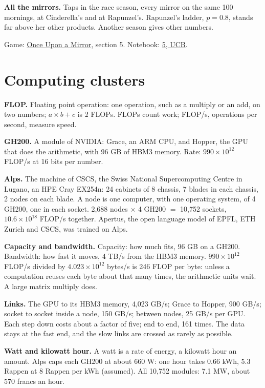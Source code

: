 \documentclass[11pt,a4paper]{article}
\newcommand{\term}[1]{\textbf{#1}}
\newcommand{\beside}[2]{\par\noindent\sbox{\besidebox}{#1}\usebox{\besidebox}\hfill
  \begin{minipage}[c]{\dimexpr\textwidth-\wd\besidebox-1.5em\relax}\raggedright#2\end{minipage}\par}
\newcommand{\Mirror}{\href{https://eth-ainit-hs26.github.io/AINIT-PAGE/viz/we2/mirror/}{Once Upon a Mirror}}
\newcommand{\NbFive}{\href{https://colab.research.google.com/github/eth-ainit-hs26/w2-cx-public/blob/main/03_cx_bandits_5_ucb_student.ipynb}{5, UCB}}
\begin{document}
\beside{}{\term{All the mirrors.} Taps in the race season, every mirror on the
same 100 mornings, at Cinderella's and at Rapunzel's. Rapunzel's ladder, $p = 0.8$, stands far above her other
products. Another season gives other numbers.}

Game: \Mirror, section 5. Notebook: \NbFive.

\section{Computing clusters}

\term{FLOP.} Floating point operation: one operation, such as a multiply or an add, on two numbers; $a \times b + c$
is 2 FLOPs. FLOPs count work; FLOP/s, operations per second, measure speed.

\term{GH200.} A module of NVIDIA: Grace, an ARM CPU, and Hopper, the GPU that does the arithmetic, with 96 GB of
HBM3 memory. Rate: $990 \times 10^{12}$ FLOP/s at 16 bits per number.

\term{Alps.} The machine of CSCS, the Swiss National Supercomputing Centre in Lugano, an HPE Cray EX254n: 24 cabinets
of 8 chassis, 7 blades in each chassis, 2 nodes on each blade. A node is one computer, with one operating system, of
4 GH200, one in each socket. 2,688 nodes $\times$ 4 GH200 $=$ 10,752 sockets, $10.6 \times 10^{18}$ FLOP/s together.
Apertus, the open language model of EPFL, ETH Zurich and CSCS, was trained on Alps.

\term{Capacity and bandwidth.} Capacity: how much fits, 96 GB on a GH200. Bandwidth: how fast it moves, 4 TB/s from
the HBM3 memory. $990 \times 10^{12}$ FLOP/s divided by $4.023 \times 10^{12}$ bytes/s is 246 FLOP per byte: unless a
computation reuses each byte about that many times, the arithmetic units wait. A large matrix multiply does.

\term{Links.} The GPU to its HBM3 memory, 4,023 GB/s; Grace to Hopper, 900 GB/s; socket to socket inside a node,
150 GB/s; between nodes, 25 GB/s per GPU. Each step down costs about a factor of five; end to end, 161 times. The
data stays at the fast end, and the slow links are crossed as rarely as possible.

\term{Watt and kilowatt hour.} A watt is a rate of energy, a kilowatt hour an amount. Alps caps each GH200 at about
660 W: one hour takes 0.66 kWh, 5.3 Rappen at 8 Rappen per kWh (assumed). All 10,752 modules: 7.1 MW, about 570
francs an hour.
\end{document}
